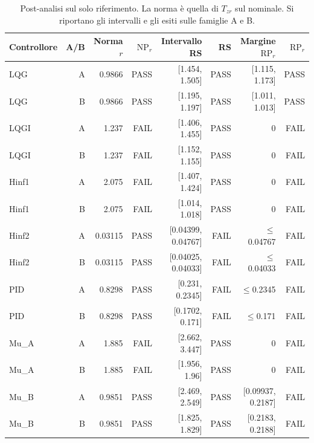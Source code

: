\begin{table}[htbp]\centering\small
\setlength{\tabcolsep}{4pt}
\begin{tabular}{lrrrrrrr}\toprule
Controllore & A/B & Norma $r$ & $\mathrm{NP}_r$ & Intervallo RS & RS & Margine $\mathrm{RP}_r$ & $\mathrm{RP}_r$\\\midrule
LQG & A & \num{0.9866} & PASS & [\num{1.454}, \num{1.505}] & PASS & [\num{1.115}, \num{1.173}] & PASS\\
LQG & B & \num{0.9866} & PASS & [\num{1.195}, \num{1.197}] & PASS & [\num{1.011}, \num{1.013}] & PASS\\
LQGI & A & \num{1.237} & FAIL & [\num{1.406}, \num{1.455}] & PASS & 0 & FAIL\\
LQGI & B & \num{1.237} & FAIL & [\num{1.152}, \num{1.155}] & PASS & 0 & FAIL\\
Hinf1 & A & \num{2.075} & FAIL & [\num{1.407}, \num{1.424}] & PASS & 0 & FAIL\\
Hinf1 & B & \num{2.075} & FAIL & [\num{1.014}, \num{1.018}] & PASS & 0 & FAIL\\
Hinf2 & A & \num{0.03115} & PASS & [\num{0.04399}, \num{0.04767}] & FAIL & $\leq$\num{0.04767} & FAIL\\
Hinf2 & B & \num{0.03115} & PASS & [\num{0.04025}, \num{0.04033}] & FAIL & $\leq$\num{0.04033} & FAIL\\
PID & A & \num{0.8298} & PASS & [\num{0.231}, \num{0.2345}] & FAIL & $\leq$\num{0.2345} & FAIL\\
PID & B & \num{0.8298} & PASS & [\num{0.1702}, \num{0.171}] & FAIL & $\leq$\num{0.171} & FAIL\\
Mu\_A & A & \num{1.885} & FAIL & [\num{2.662}, \num{3.447}] & PASS & 0 & FAIL\\
Mu\_A & B & \num{1.885} & FAIL & [\num{1.956}, \num{1.96}] & PASS & 0 & FAIL\\
Mu\_B & A & \num{0.9851} & PASS & [\num{2.469}, \num{2.549}] & PASS & [\num{0.09937}, \num{0.2187}] & FAIL\\
Mu\_B & B & \num{0.9851} & PASS & [\num{1.825}, \num{1.829}] & PASS & [\num{0.2183}, \num{0.2188}] & FAIL\\
\bottomrule\end{tabular}
\caption{Post-analisi sul solo riferimento. La norma è quella di $T_{zr}$ sul nominale. Si riportano gli intervalli e gli esiti sulle famiglie A e B.}
\label{tab:cap9-robustezza}
\end{table}
